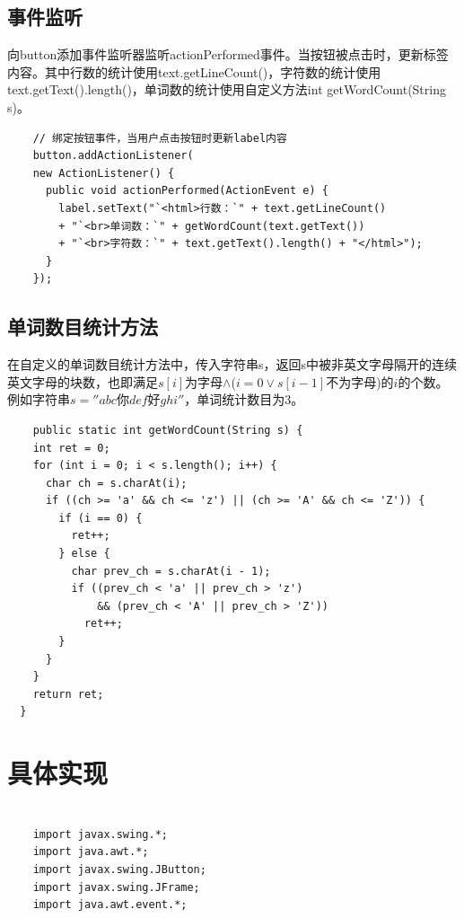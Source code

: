 \documentclass[11pt, a4paper]{article}
\begin{document}
\begin{CJK*}{UTF8}{gbsn}
  \subsection{事件监听}
  
  向button添加事件监听器监听actionPerformed事件。当按钮被点击时，更新标签内容。其中行数的统计使用text.getLineCount()，字符数的统计使用text.getText().length()，单词数的统计使用自定义方法int getWordCount(String s)。
  
  \begin{lstlisting}
    // 绑定按钮事件，当用户点击按钮时更新label内容
    button.addActionListener(
    new ActionListener() {
      public void actionPerformed(ActionEvent e) {
        label.setText("`<html>行数：`" + text.getLineCount()
        + "`<br>单词数：`" + getWordCount(text.getText())
        + "`<br>字符数：`" + text.getText().length() + "</html>");
      }
    });
  \end{lstlisting}

  \subsection{单词数目统计方法}

  在自定义的单词数目统计方法中，传入字符串s，返回s中被非英文字母隔开的连续英文字母的块数，也即满足$s[i]$为字母$\land$($i=0 \lor s[i-1]$不为字母)的$i$的个数。例如字符串$s=''abc$你$def$好$ghi''$，单词统计数目为3。

  \begin{lstlisting}
    public static int getWordCount(String s) {
    int ret = 0;
    for (int i = 0; i < s.length(); i++) {
      char ch = s.charAt(i);
      if ((ch >= 'a' && ch <= 'z') || (ch >= 'A' && ch <= 'Z')) {
        if (i == 0) {
          ret++;
        } else {
          char prev_ch = s.charAt(i - 1);
          if ((prev_ch < 'a' || prev_ch > 'z')
              && (prev_ch < 'A' || prev_ch > 'Z'))
            ret++;
        }
      }
    }
    return ret;
  }
  \end{lstlisting}
  
  \section{具体实现}

  \begin{lstlisting}

    import javax.swing.*;
    import java.awt.*;
    import javax.swing.JButton;
    import javax.swing.JFrame;
    import java.awt.event.*;
    

\end{lstlisting}
\end{CJK*}
\end{document}
